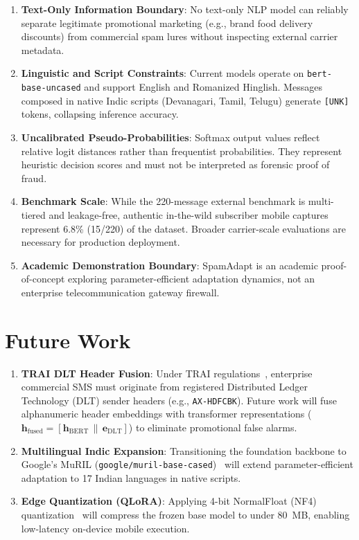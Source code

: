 \documentclass[conference]{IEEEtran}
\begin{document}
\begin{enumerate}
    \item \textbf{Text-Only Information Boundary}: No text-only NLP model can reliably separate legitimate promotional marketing (e.g., brand food delivery discounts) from commercial spam lures without inspecting external carrier metadata.
    \item \textbf{Linguistic and Script Constraints}: Current models operate on \texttt{bert-base-uncased} and support English and Romanized Hinglish. Messages composed in native Indic scripts (Devanagari, Tamil, Telugu) generate \texttt{[UNK]} tokens, collapsing inference accuracy.
    \item \textbf{Uncalibrated Pseudo-Probabilities}: Softmax output values reflect relative logit distances rather than frequentist probabilities. They represent heuristic decision scores and must not be interpreted as forensic proof of fraud.
    \item \textbf{Benchmark Scale}: While the 220-message external benchmark is multi-tiered and leakage-free, authentic in-the-wild subscriber mobile captures represent 6.8\% (15/220) of the dataset. Broader carrier-scale evaluations are necessary for production deployment.
    \item \textbf{Academic Demonstration Boundary}: SpamAdapt is an academic proof-of-concept exploring parameter-efficient adaptation dynamics, not an enterprise telecommunication gateway firewall.
\end{enumerate}

\section{Future Work}
\label{sec:future_work}

\begin{enumerate}
    \item \textbf{TRAI DLT Header Fusion}: Under TRAI regulations~\cite{trai2018tcccpr}, enterprise commercial SMS must originate from registered Distributed Ledger Technology (DLT) sender headers (e.g., \texttt{AX-HDFCBK}). Future work will fuse alphanumeric header embeddings with transformer representations ($\mathbf{h}_{\text{fused}} = [\mathbf{h}_{\text{BERT}} \,\|\, \mathbf{e}_{\text{DLT}}]$) to eliminate promotional false alarms.
    \item \textbf{Multilingual Indic Expansion}: Transitioning the foundation backbone to Google's MuRIL (\texttt{google/muril-base-cased})~\cite{khanuja2021muril} will extend parameter-efficient adaptation to 17 Indian languages in native scripts.
    \item \textbf{Edge Quantization (QLoRA)}: Applying 4-bit NormalFloat (NF4) quantization~\cite{dettmers2024qlora} will compress the frozen base model to under 80~MB, enabling low-latency on-device mobile execution.
\end{enumerate}
\end{document}
